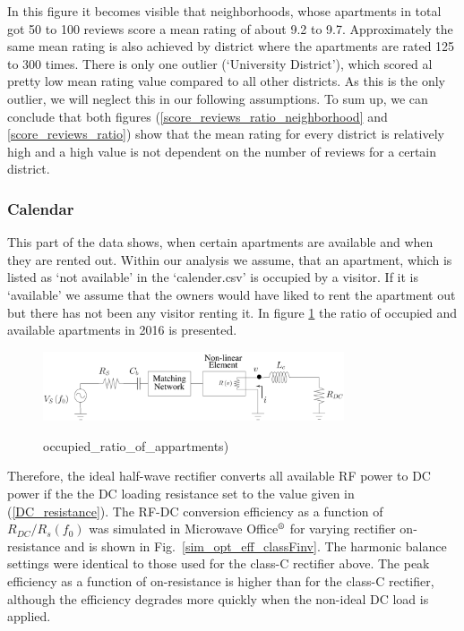 In this figure it becomes visible that neighborhoods, whose apartments in total got 50 to 100 reviews score a mean rating of about 9.2 to 9.7. Approximately the same mean rating is also achieved by district where the apartments are rated 125 to 300 times. There is only one outlier (‘University District’), which scored al pretty low mean rating value compared to all other districts. As this is the only outlier, we will neglect this in our following assumptions.
To sum up, we can conclude that both figures (\ref{score_reviews_ratio_neighborhood} and \ref{score_reviews_ratio}) show that the mean rating for every district is relatively high and a high value is not dependent on the number of reviews for a certain district.
\subsubsection{Calendar}
This part of the data shows, when certain apartments are available and when they are rented out. Within our analysis we assume, that an apartment, which is listed as ‘not available’ in the ‘calender.csv’ is occupied by a visitor. If it is ‘available’ we assume that the owners would have liked to rent the apartment out but there has not been any visitor renting it. In figure \ref{occupied_ratio_of_appartments} the ratio of occupied and available apartments in 2016 is presented.
\begin{figure}
  \begin{center}
  \includegraphics[width=3.5in]{pdf/01.pdf}\\
  \caption{occupied_ratio_of_appartments)}\label{occupied_ratio_of_appartments}
  \end{center}
\end{figure}

Therefore, the ideal half-wave rectifier converts all available RF power to DC power if the the DC loading resistance set to the value given in (\ref{DC_resistance}). The RF-DC conversion efficiency as a function of $R_{DC} / R_s(f_0)$ was simulated in Microwave Office$\textsuperscript{\textregistered}$ for varying rectifier on-resistance and is shown in Fig.~\ref{sim_opt_eff_classFinv}. The harmonic balance settings were identical to those used for the class-C rectifier above. The peak efficiency as a function of on-resistance is higher than for the class-C rectifier, although the efficiency degrades more quickly when the non-ideal DC load is applied.

